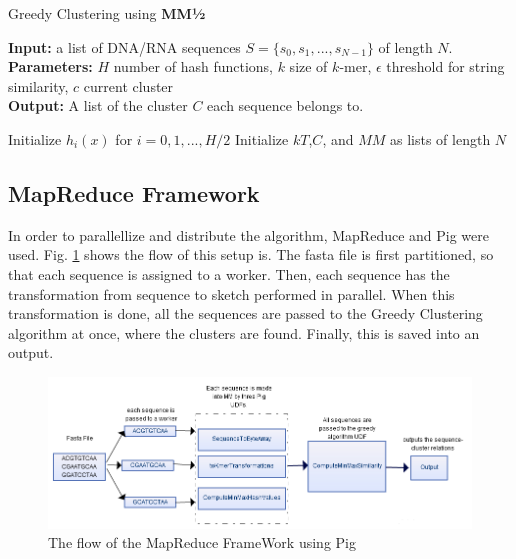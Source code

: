 \documentclass[../../main.tex]{subfiles}
\begin{document}
\begin{algorithm}
\caption{Greedy Clustering using {\bf MM½}}\label{alg:minmaxhalfclust}
\textbf{Input:} a list of DNA/RNA sequences $S=\{s_0,s_1,...,s_{N-1}\}$ of length $N$.\\
\textbf{Parameters:} $H$ number of hash functions, $k$ size of $k$-mer,	$\epsilon$ threshold for string similarity, $c$ current cluster \\
\textbf{Output:} A list of the cluster $C$ each sequence belongs to.
\begin{algorithmic}[1]
\State Initialize $h_i(x)$ for $i=0,1,...,H/2$
\State Initialize $kT$,$C$, and $MM$ as lists of length $N$
\EndFor
{}
					\EndIf
					\EndIf
				\EndFor
				\EndIf
			\EndIf
		\EndFor
	\EndIf
\EndFor
\end{algorithmic}
\end{algorithm}
\newpage

\subsection{MapReduce Framework}
In order to parallellize and distribute the algorithm, MapReduce and Pig were used. Fig. \ref{fig:mapredflow} shows the flow of this setup is. The fasta file is first partitioned, so that each sequence is assigned to a worker. Then, each sequence has the transformation from sequence to sketch performed in parallel. When this transformation is done, all the sequences are passed to the Greedy Clustering algorithm at once, where the clusters are found. Finally, this is saved into an output.

\begin{figure}[h]
\includegraphics[scale=0.5]{data/MapReduce}
\caption{The flow of the MapReduce FrameWork using Pig}\label{fig:mapredflow}
\end{figure}
\end{document}
